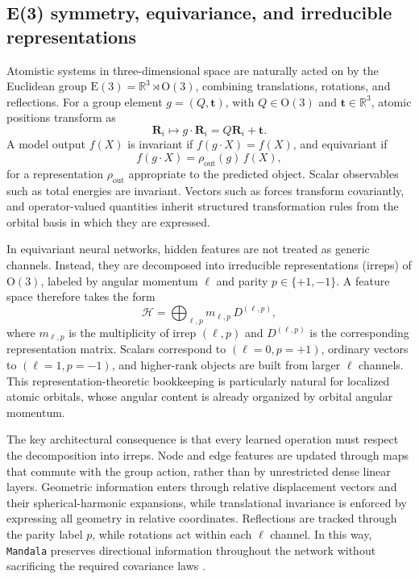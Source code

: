 \subsection{E(3) symmetry, equivariance, and irreducible representations}
\label{subsec:egnn_background}

Atomistic systems in three-dimensional space are naturally acted on by the
Euclidean group $\mathrm{E}(3)=\mathbb{R}^3 \rtimes \mathrm{O}(3)$, combining
translations, rotations, and reflections. For a group element
$g=(Q,\bm{t})$, with $Q \in \mathrm{O}(3)$ and $\bm{t}\in\mathbb{R}^3$, atomic
positions transform as
\begin{equation}
\bm{R}_i \mapsto g \cdot \bm{R}_i = Q \bm{R}_i + \bm{t}.
\end{equation}
A model output $f(X)$ is invariant if
$f(g \cdot X)=f(X)$, and equivariant if
\begin{equation}
f(g \cdot X) = \rho_{\mathrm{out}}(g)\, f(X),
\end{equation}
for a representation $\rho_{\mathrm{out}}$ appropriate to the predicted object.
Scalar observables such as total energies are invariant. Vectors such as forces
transform covariantly, and operator-valued quantities inherit structured
transformation rules from the orbital basis in which they are expressed.

In equivariant neural networks, hidden features are not treated as generic
channels. Instead, they are decomposed into irreducible representations
(irreps) of $\mathrm{O}(3)$, labeled by angular momentum $\ell$ and parity
$p \in \{+1,-1\}$. A feature space therefore takes the form
\begin{equation}
\mathcal{H}
=
\bigoplus_{\ell,p} m_{\ell,p} \, D^{(\ell,p)},
\end{equation}
where $m_{\ell,p}$ is the multiplicity of irrep $(\ell,p)$ and
$D^{(\ell,p)}$ is the corresponding representation matrix. Scalars correspond
to $(\ell=0,p=+1)$, ordinary vectors to $(\ell=1,p=-1)$, and higher-rank
objects are built from larger $\ell$ channels. This representation-theoretic
bookkeeping is particularly natural for localized atomic orbitals, whose
angular content is already organized by orbital angular momentum.

The key architectural consequence is that every learned operation must respect
the decomposition into irreps. Node and edge features are updated through maps
that commute with the group action, rather than by unrestricted dense linear
layers. Geometric information enters through relative displacement vectors and
their spherical-harmonic expansions, while translational invariance is enforced
by expressing all geometry in relative coordinates. Reflections are tracked
through the parity label $p$, while rotations act within each $\ell$ channel.
In this way, \texttt{Mandala}
preserves directional information throughout the network without sacrificing the
required covariance laws \cite{KoKoBe22,Rackers_2023}.
